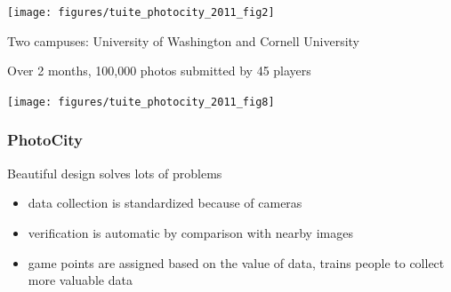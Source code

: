 \documentclass[aspectratio=169]{beamer}
\begin{document}
\begin{frame}

\begin{center}
\texttt{[image: figures/tuite\_photocity\_2011\_fig2]}
\end{center}

Two campuses: University of Washington and Cornell University

\end{frame}
\begin{frame}

Over 2 months, 100,000 photos submitted by 45 players
\vfill
\begin{center}
\texttt{[image: figures/tuite\_photocity\_2011\_fig8]}
\end{center}

\end{frame}
\begin{frame}
\frametitle{PhotoCity}

Beautiful design solves lots of problems
\pause
\begin{itemize}
\item data collection is standardized because of cameras
\pause
\item verification is automatic by comparison with nearby images
\pause
\item game points are assigned based on the value of data, trains people to collect more valuable data
\end{itemize}

\end{frame}
\frame{\titlepage}
\end{document}
